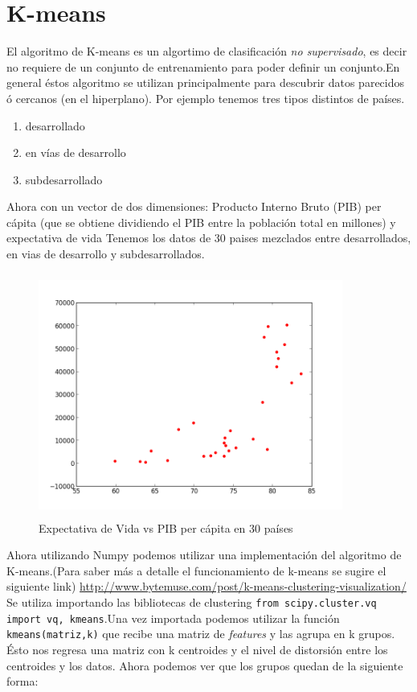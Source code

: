 \documentclass{article}
\begin{document}
\section{K-means}
El algoritmo de K-means es un algortimo de clasificación \textit{no supervisado}, es decir no requiere de un conjunto de entrenamiento para poder definir un conjunto.En general éstos algoritmo se utilizan principalmente para descubrir datos parecidos ó cercanos (en el hiperplano).
Por ejemplo tenemos tres tipos distintos de países.
\begin{enumerate}
\item desarrollado
\item en vías de desarrollo
\item subdesarrollado
\end{enumerate}
Ahora con un vector de dos dimensiones:
Producto Interno Bruto (PIB) per cápita (que se obtiene dividiendo el PIB entre la población total en millones) y expectativa de vida
Tenemos los datos de 30 paises mezclados entre desarrollados, en vias de desarrollo y subdesarrollados.
\begin{figure}[h]
\centering
\includegraphics[width=10cm, height=8cm]{paises_plot1.png}
\caption{Expectativa de Vida vs PIB per cápita en 30 países}
\label{fig:fig}
\end{figure}

Ahora utilizando Numpy podemos utilizar una implementación del algoritmo de K-means.(Para saber más a detalle el funcionamiento de k-means se sugire el siguiente link) \url{http://www.bytemuse.com/post/k-means-clustering-visualization/}
Se utiliza importando las bibliotecas de clustering
\verb#from scipy.cluster.vq import vq, kmeans#.Una vez importada podemos utilizar la función \verb#kmeans(matriz,k)# que recibe una matriz de \textit{features} y las agrupa en k grupos.
Ésto nos regresa una matriz con k centroides y el nivel de distorsión entre los centroides y los datos.
Ahora podemos ver que los grupos quedan de la siguiente forma:
\end{document}
